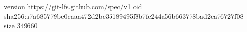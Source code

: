 version https://git-lfs.github.com/spec/v1
oid sha256:a7a685779be0caaa472d2bc35189495f8b7fe244a56b663778bad2ca76727f08
size 349660

